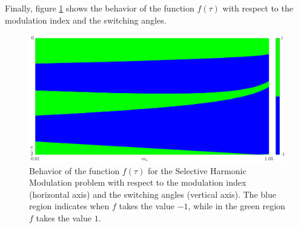\documentclass[a4paper]{article}
\numberwithin{equation}{section}
\begin{document}
Finally, figure \ref{fig:anglesModulation} shows the behavior of the function $f(\tau)$ with respect to the modulation index and the switching angles. 

\begin{figure}
	\centering 
	\includegraphics[scale=0.25]{anglesModulation}
	\caption{Behavior of the function $f(\tau)$ for the Selective Harmonic Modulation problem with respect to the modulation index (horizontal axis) and the switching angles (vertical axis). The blue region indicates when $f$ takes the value $-1$, while in the green region $f$ takes the value $1$.}\label{fig:anglesModulation}
\end{figure}
\end{document}
